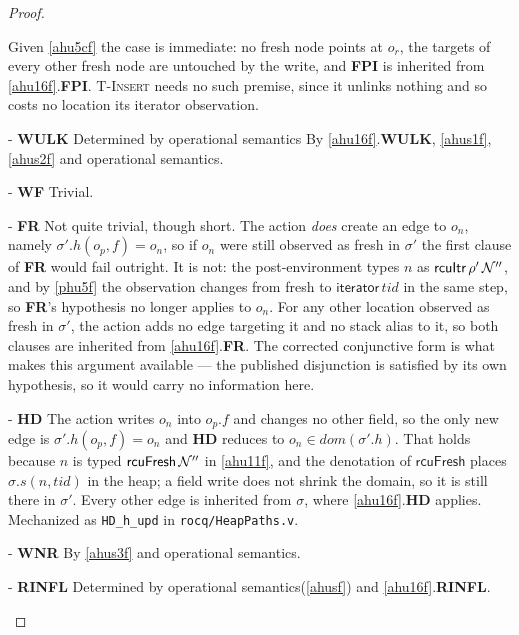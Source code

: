 \begin{proof}
\begin{case}
Given \ref{ahu5cf} the case is immediate: no \textsf{fresh} node points at
$o_r$, the targets of every other \textsf{fresh} node are untouched by the
write, and \textbf{FPI} is inherited from \ref{ahu16f}.\textbf{FPI}.
\textsc{T-Insert} needs no such premise, since it unlinks nothing and so costs
no location its \textsf{iterator} observation.
\end{case}
\begin{case} - \textbf{WULK} Determined by operational semantics By \ref{ahu16f}.\textbf{WULK}, \ref{ahus1f}, \ref{ahus2f} and operational semantics.
\end{case}
\begin{case} - \textbf{WF} Trivial.
\end{case}
\begin{case} - \textbf{FR}
Not quite trivial, though short.  The action \emph{does} create an edge to
$o_n$, namely $\sigma'.h(o_p,f) = o_n$, so if $o_n$ were still observed as
\textsf{fresh} in $\sigma'$ the first clause of \textbf{FR} would fail outright.
It is not: the post-environment types $n$ as $\textsf{rcuItr}\,\rho'\,\mathcal{N}''$, and
by \ref{phu5f} the observation changes from \textsf{fresh} to
$\textsf{iterator}\,tid$ in the same step, so \textbf{FR}'s hypothesis no longer
applies to $o_n$.  For any other location observed as \textsf{fresh} in
$\sigma'$, the action adds no edge targeting it and no stack alias to it, so
both clauses are inherited from \ref{ahu16f}.\textbf{FR}.  The corrected
conjunctive form is what makes this argument available --- the published
disjunction is satisfied by its own hypothesis, so it would carry no
information here.
\end{case}
\begin{case} - \textbf{HD}
The action writes $o_n$ into $o_p.f$ and changes no other field, so the only new
edge is $\sigma'.h(o_p,f) = o_n$ and \textbf{HD} reduces to $o_n \in
dom(\sigma'.h)$.  That holds because $n$ is typed $\textsf{rcuFresh}\,\mathcal{N}''$ in
\ref{ahu11f}, and the denotation of $\textsf{rcuFresh}$ places
$\sigma.s(n,tid)$ in the heap; a field write does not shrink the domain, so it
is still there in $\sigma'$.  Every other edge is inherited from $\sigma$, where
\ref{ahu16f}.\textbf{HD} applies.  Mechanized as \texttt{HD\_h\_upd} in
\texttt{rocq/HeapPaths.v}.
\end{case}
\begin{case} - \textbf{WNR} By \ref{ahus3f} and operational semantics.
\end{case}
\begin{case} - \textbf{RINFL} Determined by operational semantics(\ref{ahusf}) and \ref{ahu16f}.\textbf{RINFL}.

\end{case}
\end{proof}
